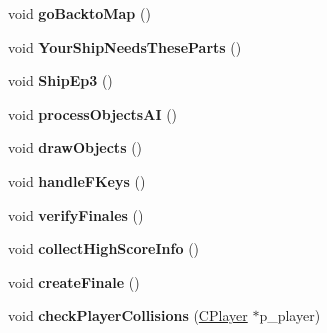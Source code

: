 \begin{DoxyCompactItemize}
\item 
\hypertarget{class_c_play_game_vorticon_a86c5186e0117f942eec93e112a5a7171}{
void {\bfseries goBacktoMap} ()}
\label{class_c_play_game_vorticon_a86c5186e0117f942eec93e112a5a7171}

\item 
\hypertarget{class_c_play_game_vorticon_af38acbe299b56eed9cd2ce595d31b93a}{
void {\bfseries YourShipNeedsTheseParts} ()}
\label{class_c_play_game_vorticon_af38acbe299b56eed9cd2ce595d31b93a}

\item 
\hypertarget{class_c_play_game_vorticon_aa1ef771d6f6cb98cd8dfe2d5c661204b}{
void {\bfseries ShipEp3} ()}
\label{class_c_play_game_vorticon_aa1ef771d6f6cb98cd8dfe2d5c661204b}

\item 
\hypertarget{class_c_play_game_vorticon_a58808c5cffbb7424fc2c12f3c53dacc2}{
void {\bfseries processObjectsAI} ()}
\label{class_c_play_game_vorticon_a58808c5cffbb7424fc2c12f3c53dacc2}

\item 
\hypertarget{class_c_play_game_vorticon_a97f346c2bf492a2086ebb7c4f0910aa3}{
void {\bfseries drawObjects} ()}
\label{class_c_play_game_vorticon_a97f346c2bf492a2086ebb7c4f0910aa3}

\item 
\hypertarget{class_c_play_game_vorticon_ae452ddcbf462da7c6289834d65142a21}{
void {\bfseries handleFKeys} ()}
\label{class_c_play_game_vorticon_ae452ddcbf462da7c6289834d65142a21}

\item 
\hypertarget{class_c_play_game_vorticon_ad54eadb41ff9f29dc9dbab29516ece31}{
void {\bfseries verifyFinales} ()}
\label{class_c_play_game_vorticon_ad54eadb41ff9f29dc9dbab29516ece31}

\item 
\hypertarget{class_c_play_game_vorticon_ae4cba247b3e58d8e4a7dcdcedd268e74}{
void {\bfseries collectHighScoreInfo} ()}
\label{class_c_play_game_vorticon_ae4cba247b3e58d8e4a7dcdcedd268e74}

\item 
\hypertarget{class_c_play_game_vorticon_acb2739416b352ec86cad00c96061cbd2}{
void {\bfseries createFinale} ()}
\label{class_c_play_game_vorticon_acb2739416b352ec86cad00c96061cbd2}

\item 
\hypertarget{class_c_play_game_vorticon_ab77ebd6f195d3d3da7fb35eac12da7f9}{
void {\bfseries checkPlayerCollisions} (\hyperlink{class_c_player}{CPlayer} $\ast$p\_\-player)}
\label{class_c_play_game_vorticon_ab77ebd6f195d3d3da7fb35eac12da7f9}


\end{DoxyCompactItemize}
